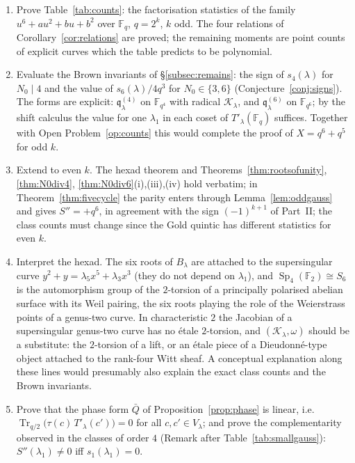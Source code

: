 ﻿\documentclass[12pt,a4paper]{amsart}
\theoremstyle{definition}
\newcommand{\F}{\mathbb{F}}
\newcommand{\Tr}{\operatorname{Tr}}
\newcommand{\Sp}{\operatorname{Sp}}
\newcommand{\Kk}{\mathcal{K}}
\newcommand{\qq}{\mathfrak{q}}
\newcommand{\Spp}{S''}
\begin{document}
\begin{enumerate}[label=\textbf{Open Problem \arabic*.},wide,labelindent=0pt,itemsep=0.8ex]
\item\label{op:counts} Prove Table~\ref{tab:counts}: the factorisation statistics of the family $u^6+au^2+bu+b^2$ over $\F_q$, $q=2^k$, $k$ odd. The four relations of Corollary~\ref{cor:relations} are proved; the remaining moments are point counts of explicit curves which the table predicts to be polynomial.
\item\label{op:brown} Evaluate the Brown invariants of \S\ref{subsec:remains}: the sign of $s_4(\lambda)$ for $N_0\mid4$ and the value of $s_6(\lambda)/4q^3$ for $N_0\in\{3,6\}$ (Conjecture~\ref{conj:signs}). The forms are explicit: $\qq^{(4)}_\lambda$ on $\F_{q^4}$ with radical $\Kk_\lambda$, and $\qq^{(6)}_\lambda$ on $\F_{q^6}$; by the shift calculus the value for one $\lambda_1$ in each coset of $T'_\lambda(\F_q)$ suffices. Together with Open Problem~\ref{op:counts} this would complete the proof of $X=q^6+q^5$ for odd $k$.
\item Extend to even $k$. The hexad theorem and Theorems~\ref{thm:rootsofunity}, \ref{thm:N0div4}, \ref{thm:N0div6}(i),(iii),(iv) hold verbatim; in Theorem~\ref{thm:fivecycle} the parity enters through Lemma~\ref{lem:oddgauss} and gives $\Spp=+q^6$, in agreement with the sign $(-1)^{k+1}$ of Part~II; the class counts must change since the Gold quintic has different statistics for even $k$.
\item Interpret the hexad. The six roots of $B_\lambda$ are attached to the supersingular curve $y^2+y=\lambda_5x^5+\lambda_3x^3$ (they do not depend on $\lambda_1$), and $\Sp_4(\F_2)\cong S_6$ is the automorphism group of the $2$-torsion of a principally polarised abelian surface with its Weil pairing, the six roots playing the role of the Weierstrass points of a genus-two curve. In characteristic $2$ the Jacobian of a supersingular genus-two curve has no \'etale $2$-torsion, and $(\Kk_\lambda,\omega)$ should be a substitute: the $2$-torsion of a lift, or an \'etale piece of a Dieudonn\'e-type object attached to the rank-four Witt sheaf. A conceptual explanation along these lines would presumably also explain the exact class counts and the Brown invariants.
\item Prove that the phase form $\bar Q$ of Proposition~\ref{prop:phase} is linear, i.e.\ $\Tr_{q/2}\bigl(\tau(c)\,T'_\lambda(c')\bigr)=0$ for all $c,c'\in V_\lambda$; and prove the complementarity observed in the classes of order $4$ (Remark after Table~\ref{tab:smallgauss}): $\Spp(\lambda_1)\ne0$ iff $s_1(\lambda_1)=0$.

\end{enumerate}
\end{document}
